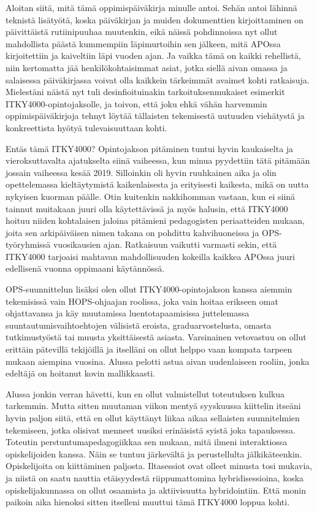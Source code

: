 \documentclass[utf8]{gradu3}
\begin{document}
Aloitan siitä, mitä tämä oppimispäiväkirja minulle antoi. Sehän antoi lähinnä
teknistä lisätyötä, koska päiväkirjan ja muiden dokumenttien kirjoittaminen on
päivittäistä rutiinipuuhaa muutenkin, eikä näissä pohdinnoissa nyt ollut
mahdollista päästä kummempiin läpimurtoihin sen jälkeen, mitä APOssa
kirjoitettiin ja kaiveltiin läpi vuoden ajan.
%
Ja vaikka tämä on kaikki rehellistä, niin kertomatta jää henkilökohtaisimmat
asiat, jotka siellä aivan omassa ja salaisessa päiväkirjassa voivat olla
kaikkein tärkeimmät avaimet kohti ratkaisuja.
%
Mielestäni näistä nyt tuli desinfioituinakin tarkoituksenmukaiset esimerkit
ITKY4000-opintojaksolle, ja toivon, että joku ehkä vähän harvemmin
oppimispäiväkirjoja tehnyt löytää tällaisten tekemisestä uutuuden viehätystä ja
konkreettista hyötyä tulevaisuuttaan kohti.


Entäs tämä ITKY4000? Opintojakson pitäminen tuntui hyvin kaukaiselta ja
vieroksuttavalta ajatukselta siinä vaiheessa, kun minua pyydettiin tätä pitämään
jossain vaiheessa kesää 2019. Silloinkin oli hyvin ruuhkainen aika ja olin
opettelemassa kieltäytymistä kaikenlaisesta ja erityisesti kaikesta, mikä on
uutta nykyisen kuorman päälle.
%
Otin kuitenkin nakkihomman vastaan, kun ei siinä tainnut muitakaan juuri olla
käytettävissä ja myös halusin, että ITKY4000 hoituu niiden kohtalaisen jaloina
pitämieni pedagogisten periaatteiden mukaan, joita sen arkipäiväisen nimen
takana on pohdittu kahvihuoneissa ja OPS-työryhmissä vuosikausien ajan.
%
Ratkaisuun vaikutti varmasti sekin, että ITKY4000 tarjoaisi mahtavan
mahdollisuuden kokeilla kaikkea APOssa juuri edellisenä vuonna oppimaani
käytännössä.


OPS-suunnittelun lisäksi olen ollut ITKY4000-opintojakson kanssa aiemmin
tekemisissä vain HOPS-ohjaajan roolissa, joka vain hoitaa erikseen omat
ohjattavansa ja käy muutamissa luentotapaamisissa juttelemassa
suuntautumisvaihtoehtojen välisistä eroista, graduarvostelusta, omasta
tutkimustyöstä tai muusta yksittäisestä asiasta. Varsinainen vetovastuu on ollut
erittäin pätevillä tekijöillä ja itselläni on ollut helppo vaan kompata tarpeen
mukaan aiempina vuosina.
%
Alussa pelotti astua aivan uudenlaiseen rooliin, jonka edeltäjä on hoitanut
kovin mallikkaasti.


Alussa jonkin verran hävetti, kun en ollut valmistellut toteutuksen kulkua
tarkemmin. Mutta sitten muutaman viikon mentyä syyskuussa kiittelin itseäni
hyvin paljon siitä, että en ollut käyttänyt liikaa aikaa sellaisten
suunnitelmien tekemiseen, jotka olisivat menneet uusiksi erinäisistä syistä joka
tapauksessa.
%
Toteutin perstuntumapedagogiikkaa sen mukaan, mitä ilmeni interaktiossa
opiskelijoiden kanssa.
%
Näin se tuntuu järkevältä ja perustellulta jälkikäteenkin.
%
Opiskelijoita on kiittäminen paljosta.  Iltasessiot ovat olleet minusta tosi
mukavia, ja niistä on saatu nauttia etäisyydestä riippumattomina
hybridisessioina, koska opiskelijakunnassa on ollut osaamista ja aktiivisuutta
hybridointiin.
%
Että monin paikoin aika hienoksi sitten itselleni muuttui tämä ITKY4000 loppua
kohti.
\end{document}
